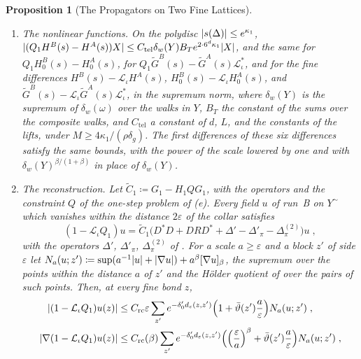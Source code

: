 \documentclass[11pt]{preprint}
\DeclarePairedDelimiter{\abs}{\lvert}{\rvert}
\numberwithin{equation}{section}
\newtheorem{proposition}{Proposition}
\theoremstyle{definition}
\theoremstyle{remark}
\theoremstyle{plain}
\begin{document}
\begin{proposition}[The Propagators on Two Fine Lattices]
\begin{enumerate}[label=(\alph*)]
\item \emph{The nonlinear functions.} On the polydisc $\abs{s(\Delta)} \leq e^{\kappa_1}$, $\abs{(Q_1H^B(s) - H^A(s))X} \leq C_{\mathrm{tel}}\delta_w(Y)B_Te^{2 \cdot 6^d\kappa_1}\abs X$, and the same for $Q_1H^B_0(s) - H^A_0(s)$, for $Q_1\tilde G^B(s) - \tilde G^A(s)\mathcal L_\iota^*$, and for the fine differences $H^B(s) - \mathcal L_\iota H^A(s)$, $H^B_0(s) - \mathcal L_\iota H^A_0(s)$, and $\tilde G^B(s) - \mathcal L_\iota\tilde G^A(s)\mathcal L_\iota^*$, in the supremum norm, where $\delta_w(Y)$ is the supremum of $\delta_w(\omega)$ over the walks in $Y$, $B_T$ the constant of the sums over the composite walks, and $C_{\mathrm{tel}}$ a constant of $d$, $L$, and the constants of the lifts, under $M \geq 4\kappa_1/(\rho\delta_g)$. The first differences of these six differences satisfy the same bounds, with the power of the scale lowered by one and with $\delta_w(Y)^{\beta/(1+\beta)}$ in place of $\delta_w(Y)$.
\item \emph{The reconstruction.} Let $\tilde C_1 \coloneqq G_1 - H_1QG_1$, with the operators and the constraint $Q$ of the one-step problem of (e). Every field $u$ of run~B on $Y^\sim$ which vanishes within the distance $2\varepsilon$ of the collar satisfies
\begin{equation}\label{eq:reconstruction}
    (1 - \mathcal L_\iota Q_1)u = \tilde C_1\bigl(D^*D + DRD^* + \Delta' - \Delta'_\pi - \Delta^{(2)}_\pi\bigr)u\;,
\end{equation}
with the operators $\Delta'$, $\Delta'_\pi$, $\Delta^{(2)}_\pi$ of \cite[(3.10), (3.120), (3.135)]{BalabanPBG}. For a scale $a \geq \varepsilon$ and a block $z'$ of side $\varepsilon$ let $N_a(u; z') \coloneqq \sup(a^{-1}\abs u + \abs{\nabla u}) + a^\beta[\nabla u]_\beta$, the supremum over the points within the distance $a$ of $z'$ and the H\"older quotient of \cite[(3.40)]{BalabanPBG} over the pairs of such points. Then, at every fine bond $z$,
\begin{equation}\label{eq:reconstruction-bound}
\begin{aligned}
    \abs{(1 - \mathcal L_\iota Q_1)u(z)} &\leq C_{\mathrm{rc}}\varepsilon\sum_{z'}e^{-\delta'_0d_\varepsilon(z, z')}\Bigl(1 + \bar\vartheta(z')\frac a\varepsilon\Bigr)N_a(u; z')\;,\\
    \abs{\nabla(1 - \mathcal L_\iota Q_1)u(z)} &\leq C_{\mathrm{rc}}(\beta)\sum_{z'}e^{-\delta'_0d_\varepsilon(z, z')}\Bigl(\Bigl(\frac\varepsilon a\Bigr)^\beta + \bar\vartheta(z')\frac a\varepsilon\Bigr)N_a(u; z')\;,
\end{aligned}

\end{equation}
\end{enumerate}
\end{proposition}
\end{document}
